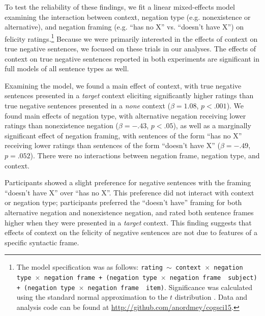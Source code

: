 \documentclass[10pt,letterpaper]{article}
\begin{document}
To test the reliability of these findings, we fit a linear mixed-effects model examining the interaction between context, negation type (e.g. nonexistence or alternative), and negation framing (e.g. ``has no X'' vs. ``doesn't have X'') on felicity ratings.\footnote{ The model specification was as follows: \texttt{rating $\sim$ context~$\times$~negation type~$\times$~negation frame + (negation type~$\times$~negation frame~\textbar~subject) +  (negation type~$\times$~negation frame~\textbar~item)}.  Significance was calculated using the standard normal approximation to the $t$ distribution \cite{barr2013}. Data and analysis code can be found at \href{http://github.com/anordmey/cogsci15}{http://github.com/anordmey/cogsci15}.} Because we were primarily interested in the effects of context on true negative sentences, we focused on these trials in our analyses.  The effects of context on true negative sentences reported in both experiments are significant in full models of all sentence types as well.

Examining the model, we found a main effect of context, with true negative sentences presented in a \emph{target} context eliciting significantly higher ratings than true negative sentences presented in a \emph{none} context ($\beta= 1.08$, $p< .001$).  We found main effects of negation type, with alternative negation receiving lower ratings than nonexistence negation ($\beta= -.43$, $p< .05$), as well as a marginally significant effect of negation framing, with sentences of the form ``has no X'' receiving lower ratings than sentences of the form ``doesn't have X''  ($\beta= -.49$, $p= .052$).  There were no interactions between negation frame, negation type, and context.  

Participants showed a slight preference for negative sentences with the framing ``doesn't have X'' over ``has no X''.  This preference did not interact with context or negation type; participants preferred the ``doesn't have'' framing for both alternative negation and nonexistence negation, and rated both sentence frames higher when they were presented in a \emph{target} context.  This finding suggests that effects of context on the felicity of negative sentences are not due to features of a specific syntactic frame.
\end{document}
